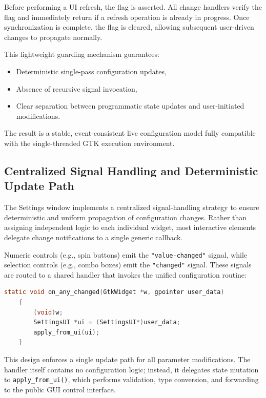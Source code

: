 Before performing a UI refresh, the flag is asserted. All change handlers verify the flag and immediately return if a refresh operation is already in progress. Once synchronization is complete, the flag is cleared, allowing subsequent user-driven changes to propagate normally.

This lightweight guarding mechanism guarantees:

\begin{itemize}
	\item Deterministic single-pass configuration updates,
	\item Absence of recursive signal invocation,
	\item Clear separation between programmatic state updates and user-initiated modifications.
\end{itemize}

The result is a stable, event-consistent live configuration model fully compatible with the single-threaded GTK execution environment.

\subsection{Centralized Signal Handling and Deterministic Update Path}
\label{sec:gui_signal_handling}

The Settings window implements a centralized signal-handling strategy to ensure deterministic and uniform propagation of configuration changes. Rather than assigning independent logic to each individual widget, most interactive elements delegate change notifications to a single generic callback.

Numeric controls (e.g., spin buttons) emit the \texttt{"value-changed"} signal, while selection controls (e.g., combo boxes) emit the \texttt{"changed"} signal. These signals are routed to a shared handler that invokes the unified configuration routine:

\begin{lstlisting}[language=C]
	static void on_any_changed(GtkWidget *w, gpointer user_data)
	{
		(void)w;
		SettingsUI *ui = (SettingsUI*)user_data;
		apply_from_ui(ui);
	}
\end{lstlisting}

This design enforces a single update path for all parameter modifications. The handler itself contains no configuration logic; instead, it delegates state mutation to \texttt{apply\_from\_ui()}, which performs validation, type conversion, and forwarding to the public GUI control interface.

